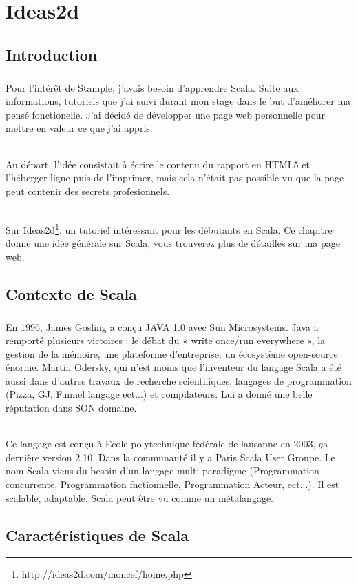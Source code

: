 \chapter{Ideas2d}
\section{Introduction}
\paragraph{}
Pour l'intérêt de Stample, j'avais besoin d'apprendre Scala.
Suite aux informations, tutoriels que j'ai suivi durant mon stage dans le but d'améliorer ma pensé fonctionelle. J'ai décidé de développer une page web personnelle pour mettre en valeur ce que j'ai appris.
\subparagraph{}
Au départ, l'idée consistait à écrire le contenu du rapport en HTML5 et l'héberger ligne puis de l'imprimer, mais cela n'était pas possible vu que la page peut contenir des secrets profesionnels. 
\subparagraph{}
Sur Ideas2d\footnote{http://ideas2d.com/moncef/home.php}, un tutoriel intéressant pour les débutants en Scala.
Ce chapitre donne une idée générale sur Scala, vous trouverez plus de détailles sur ma page web.
\section{Contexte de Scala}
\paragraph{}
En 1996, James Gosling a conçu JAVA 1.0 avec Sun Microsystems.
Java a remporté plusieurs victoires : le débat du « write once/run everywhere », la gestion de la mémoire, une plateforme d'entreprise, un écosystème open-source énorme.\newline
Martin Odersky, qui n'est moins que l'inventeur du langage Scala a été aussi dans d'autres travaux de recherche scientifiques, langages de programmation (Pizza, GJ, Funnel langage ect...) et compilateurs. Lui a donné une belle réputation dans SON domaine.
\subparagraph{}
Ce langage est conçu à  Ecole polytechnique fédérale de lausanne en 2003, ça dernière version 2.10. Dans la communauté il y a Paris Scala User Groupe.\newline
Le nom Scala viens du besoin d'un langage multi-paradigme (Programmation concurrente, Programmation fnctionnelle, Programmation Acteur, ect...). Il est scalable, adaptable. Scala peut être vu comme un métalangage.
\section{Caractéristiques de Scala}

